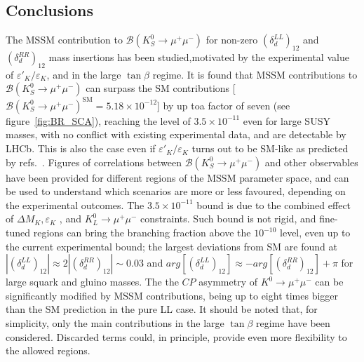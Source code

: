 \subsection{Conclusions}
The MSSM contribution to $\mathcal{B}(K_S^0\rightarrow\mu^+\mu^-)$ for non-zero $(\delta_{d}^{LL})_{12}$ and $(\delta_{d}^{RR})_{12}$  mass insertions has been studied,motivated by the experimental value of $\varepsilon'_K/\varepsilon_K$, and in the large $\tan{\beta}$ regime. 
It is found that MSSM contributions to $\mathcal{B}(K_S^0\rightarrow\mu^+\mu^-)$ can surpass the SM contributions [$\mathcal{B}(K_S^0\rightarrow\mu^+\mu^-)^{\textrm{SM}} = 5.18\times 10^{-12}$] by up toa factor of seven (see figure~\ref{fig:BR_SCA}), reaching the level of $3.5\times10^{-11}$ even for large SUSY masses, with no conflict with existing experimental data, and are detectable by LHCb. 
This is also the case even if $\varepsilon'_K/\varepsilon_K$ turns out to be SM-like as predicted by refs.~\cite{Pallante:2001he,Hambye:2003cy,Mullor}.
Figures of correlations between $\mathcal{B}(K_S^0\rightarrow\mu^+\mu^-)$ and other observables have been provided for different regions of the MSSM parameter space, and can be used to understand which scenarios are more or less favoured, depending on the experimental outcomes.
The $3.5\times10^{-11}$ bound is due to the combined effect of $\Delta M_K,\varepsilon_K$ , and $K^0_L\rightarrow\mu^+\mu^-$ constraints. Such bound is not rigid, and fine-tuned regions can bring the branching fraction above the 
$10^{-10}$ level, even up to the current experimental bound; the largest deviations from SM are found at $|(\delta_d^{LL})_{12}| \approx 2|(\delta_d^{RR})_{12}| \sim 0.03$ and $arg\left[(\delta_d^{LL})_{12}\right] \approx -arg\left[(\delta_d^{RR})_{12}\right] + \pi$ for large squark and gluino masses. 
The the $CP$ asymmetry of $K^0\rightarrow\mu^+\mu^-$ can be significantly modified by MSSM contributions, being up to eight times bigger than the SM prediction in the pure LL case. 
It should be noted that, for simplicity, only the main contributions in the large $\tan\beta$ regime have been considered. Discarded terms could, in principle, provide even more flexibility to the allowed regions.


